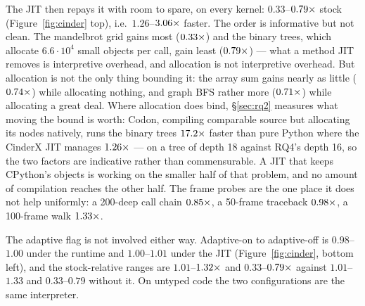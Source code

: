 The JIT then repays it with room to spare, on every kernel: $0.33$--$\meas{ratio:b6_cinderx-fork_jit:binarytrees/fork_jit|b6_cinderx-stock:binarytrees/stock}{0.79}\times$ stock
(Figure~\ref{fig:cinder} top), i.e.\ $1.26$--$\meas{ratio:b6_cinderx-stock:mandelbrot/stock|b6_cinderx-fork_jit:mandelbrot/fork_jit}{3.06}\times$ faster. The order is informative but
not clean. The mandelbrot grid gains most ($\meas{ratio:b6_cinderx-fork_jit:mandelbrot/fork_jit|b6_cinderx-stock:mandelbrot/stock}{0.33}\times$) and the binary trees, which allocate
$6.6\cdot10^4$ small objects per call, gain least ($\meas{ratio:b6_cinderx-fork_jit:binarytrees/fork_jit|b6_cinderx-stock:binarytrees/stock}{0.79}\times$) --- what a method JIT removes is
interpretive overhead, and allocation is not interpretive overhead. But allocation is not the
only thing bounding it: the array sum gains nearly as little ($\meas{ratio:b6_cinderx-fork_jit:arraysum/fork_jit|b6_cinderx-stock:arraysum/stock}{0.74}\times$) while allocating
nothing, and graph BFS rather more ($\meas{ratio:b6_cinderx-fork_jit:bfs/fork_jit|b6_cinderx-stock:bfs/stock}{0.71}\times$) while allocating a great deal. Where
allocation does bind, \S\ref{sec:rq2} measures what moving the bound is worth: Codon, compiling
comparable source but allocating its nodes natively, runs the binary trees $\meas{ratio:b2_branchy-314:binarytrees/cpython_loop|b2_branchy-314:binarytrees/codon_pyext}{17.2}\times$ faster
than pure Python where the CinderX JIT manages $\meas{ratio:b6_cinderx-stock:binarytrees/stock|b6_cinderx-fork_jit:binarytrees/fork_jit}{1.26}\times$ --- on a tree of depth 18 against
RQ4's depth 16, so the two factors are indicative rather than commensurable. A JIT that keeps
CPython's objects is working on the smaller half of that
problem, and no amount of compilation reaches the other half. The frame probes are the one
place it does not help uniformly: a 200-deep call chain $\meas{ratio:b6_cinderx-fork_jit:call_depth_200/fork_jit|b6_cinderx-stock:call_depth_200/stock}{0.85}\times$, a 50-frame traceback
$\meas{ratio:b6_cinderx-fork_jit:traceback_depth_50/fork_jit|b6_cinderx-stock:traceback_depth_50/stock}{0.98}\times$, a 100-frame walk $\meas{ratio:b6_cinderx-fork_jit:frame_walk_depth_100/fork_jit|b6_cinderx-stock:frame_walk_depth_100/stock}{1.33}\times$.

The adaptive flag is not involved either way. Adaptive-on to adaptive-off is $0.98$--$1.00$
under the runtime and $1.00$--$1.01$ under the JIT (Figure~\ref{fig:cinder}, bottom left), and
the stock-relative ranges are $1.01$--$\meas{ratio:b6_cinderx-fork_cinderx_adaptive:mandelbrot/fork_cinderx_adaptive|b6_cinderx-stock:mandelbrot/stock}{1.32}\times$ and $0.33$--$\meas{ratio:b6_cinderx-fork_jit_adaptive:binarytrees/fork_jit_adaptive|b6_cinderx-stock:binarytrees/stock}{0.79}\times$ against
$1.01$--$1.33$ and $0.33$--$0.79$ without it. On untyped code the two configurations are the
same interpreter.

